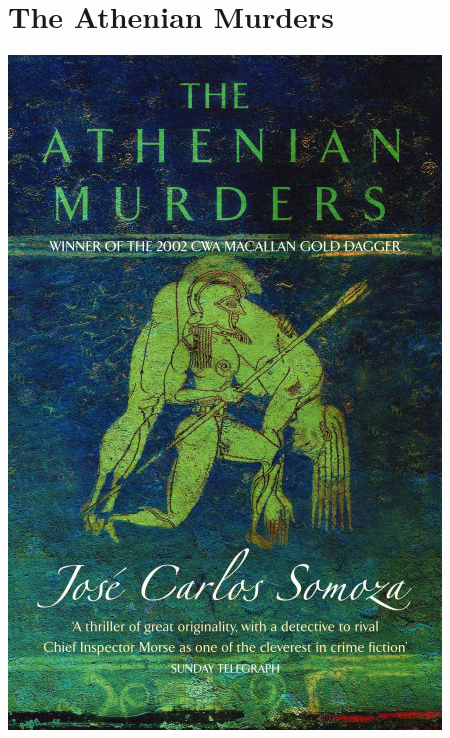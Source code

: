 \documentclass{tufte-handout}
\makeatletter
\newcommand{\varcaption}[2][0pt]{%
  \gsetlength{\@tufte@caption@vertical@offset}{-#1}%
  \gdef\@tufte@stored@varcaption{#2}%
}
\gdef\@tufte@stored@varcaption{} %
\makeatother
\begin{document}
\section*{The Athenian Murders}
\begin{marginfigure}[10\baselineskip]
   \includegraphics[width=\linewidth]{images/athenian_murders.jpg}
   \varcaption{\href{https://www.littlebrown.co.uk/titles/jose-carlos-somoza/the-athenian-murders/9780349116181/}{Publisher Link}, \href{https://www.amazon.com/Athenian-Murders-Jose-Carlos-Somoza/dp/0349116180/}{Amazon Link}}
\end{marginfigure}
\end{document}
